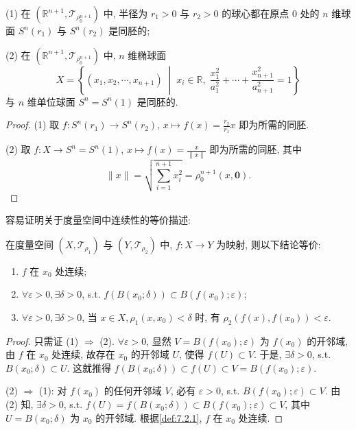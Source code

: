 \begin{example}\label{ex:7.2.1}
(1) 在 $(\mathbb{R}^{n+1}, \mathcal{T}_{\rho_0^{n+1}})$ 中, 半径为 $r_1>0$ 与 $r_2>0$ 的球心都在原点 $0$ 处的 $n$ 维球面 $S^n(r_1)$ 与 $S^n(r_2)$ 是同胚的;

(2) 在 $(\mathbb{R}^{n+1}, \mathcal{T}_{\rho_0^{n+1}})$ 中, $n$ 维椭球面
\[
  X = \left\{(x_1, x_2, \cdots, x_{n+1}) \;\middle|\; x_i \in \mathbb{R}, \; \frac{x_1^2}{a_1^2} + \cdots + \frac{x_{n+1}^2}{a_{n+1}^2} = 1 \right\}
\]
与 $n$ 维单位球面 $S^n = S^n(1)$ 是同胚的.
\end{example}

\begin{proof}
(1) 取 $f\colon S^{n}(r_{1}) \to S^{n}(r_{2})$, $x \mapsto f(x) = \frac{r_{2}}{r_{1}} x$ 即为所需的同胚.

(2) 取 $f\colon X \to S^{n} = S^{n}(1)$, $x \mapsto f(x) = \frac{x}{\|x\|}$ 即为所需的同胚, 其中
\[
  \|x\| = \sqrt{\sum_{i=1}^{n+1} x_{i}^{2}} = \rho_{0}^{n+1}(x, \boldsymbol{0}).
\]
\end{proof}

容易证明关于度量空间中连续性的等价描述:

\begin{theorem}\label{thm:7.2.1}
在度量空间 $(X, \mathcal{T}_{\rho_1})$ 与 $(Y, \mathcal{T}_{\rho_2})$ 中, $f\colon X \to Y$ 为映射, 则以下结论等价:
\begin{enumerate}
  \item $f$ 在 $x_{0}$ 处连续;
  \item $\forall \varepsilon > 0, \exists \delta > 0$, s.t. $f(B(x_0; \delta)) \subset B(f(x_0); \varepsilon)$;
  \item $\forall \varepsilon > 0, \exists \delta > 0$, 当 $x \in X, \rho_{1}(x, x_{0}) < \delta$ 时, 有 $\rho_{2}(f(x), f(x_{0})) < \varepsilon$.
\end{enumerate}
\end{theorem}

\begin{proof}
只需证 (1) $\Rightarrow$ (2). $\forall \varepsilon > 0$, 显然 $V = B(f(x_0); \varepsilon)$ 为 $f(x_0)$ 的开邻域, 由 $f$ 在 $x_0$ 处连续, 故存在 $x_0$ 的开邻域 $U$, 使得 $f(U) \subset V$. 于是, $\exists \delta > 0$, s.t. $B(x_0; \delta) \subset U$. 这就推得 $f(B(x_0; \delta)) \subset f(U) \subset V = B(f(x_0); \varepsilon)$.

(2) $\Rightarrow$ (1): 对 $f(x_{0})$ 的任何开邻域 $V$, 必有 $\varepsilon > 0$, s.t. $B(f(x_{0}); \varepsilon) \subset V$. 由 (2) 知, $\exists \delta > 0$, s.t. $f(U) = f(B(x_{0}; \delta)) \subset B(f(x_{0}); \varepsilon) \subset V$, 其中 $U = B(x_{0}; \delta)$ 为 $x_{0}$ 的开邻域. 根据\cref{def:7.2.1}, $f$ 在 $x_{0}$ 处连续.
\end{proof}


